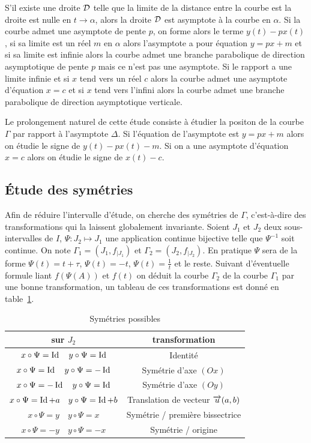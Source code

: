S'il existe une droite \(\mathcal{D}\) telle que la limite de la distance entre la courbe est la droite est nulle en \(t \to \alpha\), alors la droite \(\mathcal{D}\) est asymptote à la courbe en \(\alpha\). Si la courbe admet une asymptote de pente \(p\), on forme alors le terme \(y(t)-px(t)\), si sa limite est un réel \(m\) en \(\alpha\) alors l'asymptote a pour équation \(y=px+m\) et si sa limite est infinie alors la courbe admet une branche parabolique de direction asymptotique de pente \(p\) mais ce n'est pas une asymptote. Si le rapport a une limite infinie et si \(x\) tend vers un réel \(c\) alors la courbe admet une asymptote d'équation \(x=c\) et si \(x\) tend vers l'infini alors la courbe admet une branche parabolique de direction asymptotique verticale.

Le prolongement naturel de cette étude consiste à étudier la positon de la courbe \(\Gamma\) par rapport à l'asymptote \(\Delta\). Si l'équation de l'asymptote est \(y=px+m\) alors on étudie le signe de \(y(t)-px(t)-m\). Si on a une asymptote d'équation \(x=c\) alors on étudie le signe de \(x(t)-c\).

\subsection{Étude des symétries}
Afin de réduire l'intervalle d'étude, on cherche des symétries de \(\Gamma\), c'est-à-dire des transformations qui la laissent globalement invariante. Soient \(J_1\) et \(J_2\) deux sous-intervalles de \(I\), \(\Psi:J_2 \longmapsto J_1\) une application continue bijective telle que \(\Psi^{-1}\) soit continue. On note \(\Gamma_1=(J_1,f_{|J_1})\) et \(\Gamma_2=(J_2,f_{|J_2})\). En pratique \(\Psi\) sera de la forme \(\Psi(t)=t+\tau\), \(\Psi(t)=-t\), \(\Psi(t)=\frac{1}{t}\) et le reste. Suivant d'éventuelle formule liant \(f(\Psi(A))\) et \(f(t)\) on déduit la courbe \(\Gamma_2\) de la courbe \(\Gamma_1\) par une bonne transformation, un tableau de ces transformations est donné en table~\ref{tab:sym}.

\begin{table}
 \centering
 \begin{tabular}{|c|c|} \hline
  sur \( J_2\) & transformation \\ \hline
  \(x \circ \Psi=\operatorname{Id} \quad y \circ \Psi=\operatorname{Id}\) &Identité \\ \hline
  \(x \circ \Psi=\operatorname{Id} \quad y \circ \Psi=-\operatorname{Id}\) &Symétrie d'axe \((Ox)\) \\ \hline
  \(x \circ \Psi=-\operatorname{Id} \quad y \circ \Psi=\operatorname{Id}\) &Symétrie d'axe \((Oy)\) \\ \hline
  \(x \circ \Psi=\operatorname{Id}+a \quad y \circ \Psi=\operatorname{Id}+b\) & Translation de vecteur \(\overrightarrow{u}(a,b)\)\\ \hline
  \(x \circ \Psi=y \quad y \circ \Psi=x\) & Symétrie / première bissectrice\\ \hline
  \(x \circ \Psi=-y \quad y \circ \Psi=-x\) & Symétrie / origine\\ \hline
 \end{tabular}
 \caption{Symétries possibles}
 \label{tab:sym}
\end{table}

